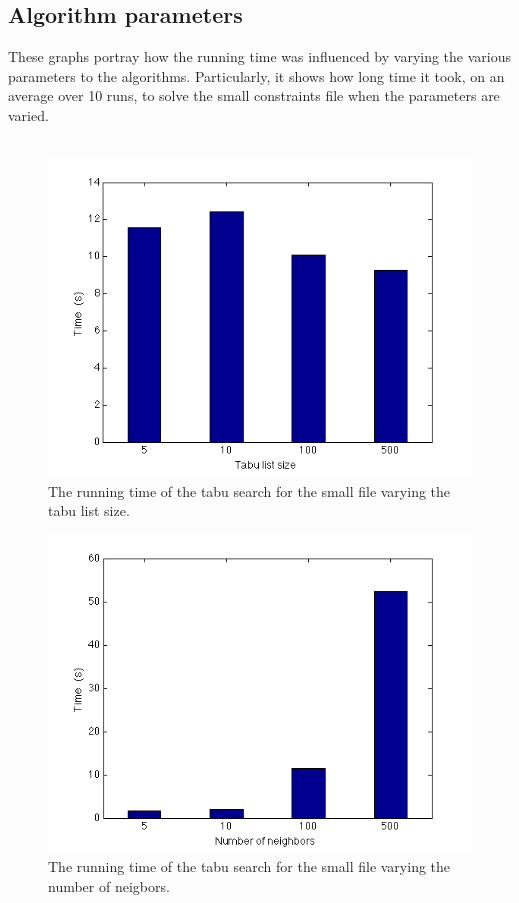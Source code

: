 \documentclass[titlepage,a4paper]{article}
\begin{document}
\subsection{Algorithm parameters}
These graphs portray how the running time was influenced by varying the various parameters to the algorithms. Particularly, it shows how long time it took, on an average over 10 runs, to solve the small constraints file when the parameters are varied. \\\\
\begin{figure}[H]
  \begin{center}
    \includegraphics[scale=0.5]{../results/figures/tabu_list_size.png}
  \end{center}
  \caption{The running time of the tabu search for the small file varying the tabu list size.}
  \label{tabu_list_size}
\end{figure}

\begin{figure}[H]
  \begin{center}
    \includegraphics[scale=0.5]{../results/figures/tabu_neighbor.png}
  \end{center}
  \caption{The running time of the tabu search for the small file varying the number of neigbors.}
  \label{tabu_neighbor}
\end{figure}
\end{document}
